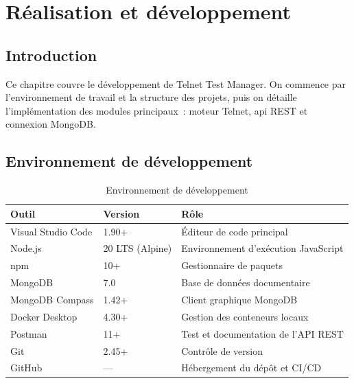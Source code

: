 \chapter{Réalisation et développement}

\section*{Introduction}
Ce chapitre couvre le développement de Telnet Test Manager. On commence
par l'environnement de travail et la structure des projets, puis on
détaille l'implémentation des modules principaux~: moteur Telnet,
\gls{api} REST et connexion MongoDB.

\section{Environnement de développement}

\begin{table}[H]
  \centering
  \caption{Environnement de développement}
  \label{tab:env_dev}
  \begin{tabularx}{\textwidth}{|L{3.5cm}|L{4cm}|X|}
    \hline
    \textbf{Outil} & \textbf{Version} & \textbf{Rôle} \\
    \hline
    Visual Studio Code & 1.90+ & Éditeur de code principal \\
    \hline
    Node.js & 20 LTS (Alpine) & Environnement d'exécution JavaScript \\
    \hline
    npm & 10+ & Gestionnaire de paquets \\
    \hline
    MongoDB & 7.0 & Base de données documentaire \\
    \hline
    MongoDB Compass & 1.42+ & Client graphique MongoDB \\
    \hline
    Docker Desktop & 4.30+ & Gestion des conteneurs locaux \\
    \hline
    Postman & 11+ & Test et documentation de l'API REST \\
    \hline
    Git & 2.45+ & Contrôle de version \\
    \hline
    GitHub & --- & Hébergement du dépôt et CI/CD \\
    \hline
  \end{tabularx}
\end{table}

